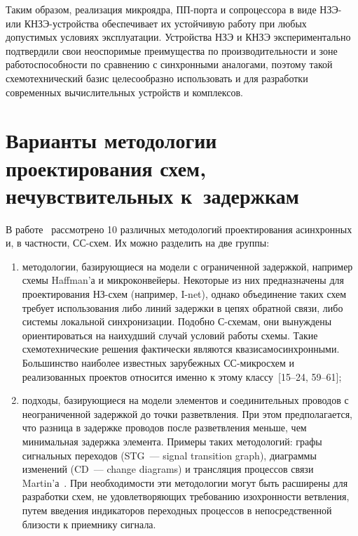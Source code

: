 \begin{multicols}{2}
      
       Таким образом, реализация микроядра, ПП-пор\-та и сопроцессора в виде НЗЭ- или 
КНЗЭ-устрой\-ст\-ва обеспечивает их устойчивую работу при любых допустимых условиях 
эксплуатации. Устройства НЗЭ и КНЗЭ экспериментально подтвердили свои не\-оспо\-ри\-мые 
преимущества по производительности и зоне работоспособности по сравнению с 
синхронными аналогами, поэтому такой схемотехнический базис целесообразно 
использовать и для разработки современных вы\-чис\-ли\-тель\-ных устройств и комплексов.
       
\section{Варианты методологии проектирования схем, нечувствительных к~задержкам}

       В работе~\cite{14-sok} рассмотрено 10 различных методологий проектирования 
асинхронных и, в частности, СС-схем. Их можно разделить на две группы:
       \begin{enumerate}[($I$)]
\item методологии, базирующиеся на модели с ограниченной задержкой, например схемы 
Haffman'а и микроконвейеры. Некоторые из них предназначены для проектирования НЗ-схем 
(например, I-net), однако объединение таких схем требует 
использования либо линий задержки в цепях обратной связи, либо системы локальной 
синхронизации. Подобно С-схе\-мам, они вынуждены ориентироваться на 
наихудший случай условий работы схемы. Такие схемотехнические решения фактически 
являются квазисамосинхронными. Большинство наиболее известных зарубежных 
СС-мик\-ро\-схем и реализованных проектов относится именно к этому классу~[15--24, 59--61];
\item подходы, базирующиеся на модели элементов и соединительных проводов с 
неограниченной задержкой до точки разветвления. При этом предполагается, что разница в 
задержке проводов после разветвления меньше, чем минимальная задержка элемента. 
Примеры таких методологий: графы сигнальных переходов (STG~--- signal transition\linebreak
graph), диаграммы изменений 
(CD~--- change diagrams) и трансляция процессов связи %
 Martin'а~\cite{7-sok, 9-sok}. При не\-об\-хо\-ди\-мости эти %
методологии могут быть расширены для разработки схем, не удовлетворяющих требованию 
изохронности ветвления, путем введения индикаторов переходных процессов в 
непосредственной близости к приемнику сигнала. 
\end{enumerate}


\end{multicols}

